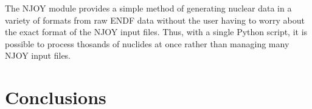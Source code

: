 \documentclass{anstrans}
\begin{document}
The NJOY module provides a simple method of generating nuclear data in a variety
of formats from raw ENDF data without the user having to worry about the exact
format of the NJOY input files. Thus, with a single Python script, it is
possible to process thosands of nuclides at once rather than managing
many NJOY input files.


\section{Conclusions}

\nocite{*}


\end{document}
